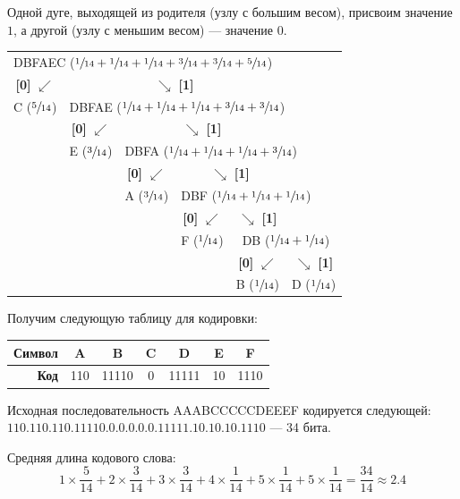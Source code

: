 \begin{example}
    Одной дуге, выходящей из родителя (узлу с большим весом), присвоим значение $1$, а другой (узлу с меньшим весом) --- значение $0$.

    \begin{table}[H]
        \centering
        \begin{tabular}{c c c c c c}
        \multicolumn{6}{l}{DBFAEC ($\sfrac{1}{14} + \sfrac{1}{14} + \sfrac{1}{14} + \sfrac{3}{14} + \sfrac{3}{14} + \sfrac{5}{14}$)} \\
        \textbf{[0]} $\swarrow$ & \multicolumn{4}{c}{$\searrow$ \textbf{[1]}} & \\
        C ($\sfrac{5}{14}$) & \multicolumn{5}{l}{DBFAE ($\sfrac{1}{14} + \sfrac{1}{14} + \sfrac{1}{14} + \sfrac{3}{14} + \sfrac{3}{14}$)} \\
        & \textbf{[0]} $\swarrow$ & \multicolumn{3}{c}{$\searrow$ \textbf{[1]}} & \\
        & E ($\sfrac{3}{14}$) & \multicolumn{4}{l}{DBFA ($\sfrac{1}{14} + \sfrac{1}{14} + \sfrac{1}{14} + \sfrac{3}{14}$)} \\
        & & \textbf{[0]} $\swarrow$ & \multicolumn{2}{c}{$\searrow$ \textbf{[1]}} & \\
        & & A ($\sfrac{3}{14}$) & \multicolumn{3}{l}{DBF ($\sfrac{1}{14} + \sfrac{1}{14} + \sfrac{1}{14}$)} \\
        & & & \textbf{[0]} $\swarrow$ & $\searrow$ \textbf{[1]} & \\
        & & & F ($\sfrac{1}{14}$) & \multicolumn{2}{c}{DB ($\sfrac{1}{14} + \sfrac{1}{14}$)} \\
        & & & & \textbf{[0]} $\swarrow$ & $\searrow$  \textbf{[1]} \\
        & & & & B ($\sfrac{1}{14}$) & D ($\sfrac{1}{14}$) \\
        \end{tabular}
    \end{table}

    Получим следующую таблицу для кодировки:

    \begin{table}[H]
        \centering
        \begin{tabular}{|r|c|c|c|c|c|c|}
        \hline
        \textbf{Символ} & A & B & C & D & E & F \\ \hline
        \textbf{Код} & 110 & 11110 & 0 & 11111 & 10 & 1110 \\ \hline
        \end{tabular}
    \end{table}

    \answer%
    Исходная последовательность AAABCCCCCDEEEF кодируется следующей: $110.110.110.11110.0.0.0.0.0.11111.10.10.10.1110$ --- 34 бита.

    Средняя длина кодового слова:
    \[
        1 \times \frac{5}{14} + 2 \times \frac{3}{14} + 3 \times \frac{3}{14} + 4 \times \frac{1}{14} + 5 \times \frac{1}{14} + 5 \times \frac{1}{14} = \frac{34}{14} \approx \num{2.4}
    \]
\end{example}

